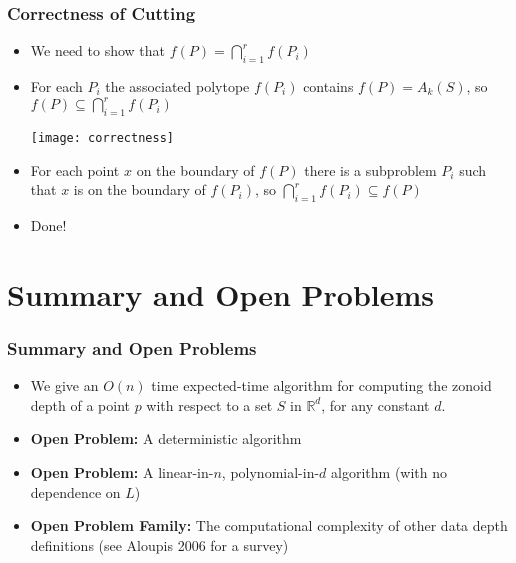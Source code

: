 \documentclass{beamer}
\begin{document}
{

\frame
{
   \frametitle{Correctness of Cutting}
   \begin{itemize}
     \item<1-> We need to show that $f(P)=\bigcap_{i=1}^r f(P_i)$
     \item<2-> For each $P_i$ the associated polytope $f(P_i)$ contains
          $f(P)=A_k(S)$,  so $f(P) \subseteq \bigcap_{i=1}^r f(P_i)$
          \begin{center}\texttt{[image: correctness]}\end{center}
     \item<3-> For each point $x$ on the boundary of $f(P)$ there is a
	subproblem $P_i$ such that $x$ is on the boundary of $f(P_i)$,
	so $\bigcap_{i=1}^r f(P_i)\subseteq f(P)$
     \item<4-> Done!
   \end{itemize}
}

\section{Summary and Open Problems}

\frame
{
   \frametitle{Summary and Open Problems}
   \begin{itemize}

     \item<1-> We give an $O(n)$ time expected-time algorithm for
computing the zonoid depth of a point $p$ with respect to a set $S$ in
$\mathbb{R}^d$, for any constant $d$.

     \item<2-> \textbf{Open Problem:} A deterministic algorithm
     \item<3-> \textbf{Open Problem:} A linear-in-$n$, polynomial-in-$d$
         algorithm (with no dependence on $L$)
     \item<4-> \textbf{Open Problem Family:} The computational complexity
	of other data depth definitions (see Aloupis 2006 for a survey)
   \end{itemize}
}

}
\end{document}
